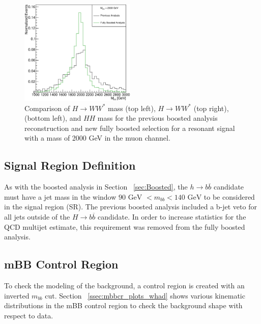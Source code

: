 \begin{figure}[h!]
\begin{center}
\includegraphics[width=0.49\textwidth]{figures/WHad_plots_john_withcuts/muon/hh_m_Xhh2000}
\caption[Comparison of ${H\rightarrow WW^{*}}$ mass, ${H\rightarrow WW^{*}}$ \pt, \met , and $HH$ mass for the muon channel]{Comparison of ${H\rightarrow WW^{*}}$ mass (top left), ${H\rightarrow WW^{*}}$ \pt (top right), \met (bottom left), and $HH$ mass for the  previous boosted analysis reconstruction and new fully boosted selection for a resonant signal with a mass of 2000 GeV in the muon channel.}
\label{fig:muon_sel}
\end{center}
\end{figure}





\subsection{Signal Region Definition}
As with the boosted analysis in Section ~\ref{sec:Boosted}, the ${h\rightarrow b\overline{b}}$ candidate must have a jet mass in the window ${90 \text{ GeV } < m_{bb} < 140 \text{ GeV}}$ to be considered in the signal region (SR). The previous boosted analysis included a b-jet veto for all jets outside of the ${H\rightarrow b\overline{b}}$ candidate. In order to increase statistics for the QCD multijet estimate, this requirement was removed from the fully boosted analysis.

\subsection{mBB Control Region}
To check the modeling of the background, a control region is created with an inverted ${m_{bb}}$ cut. Section ~\ref{ssec:mbbcr_plots_whad} shows various kinematic distributions in  the mBB control region to check the background shape with respect to data.
